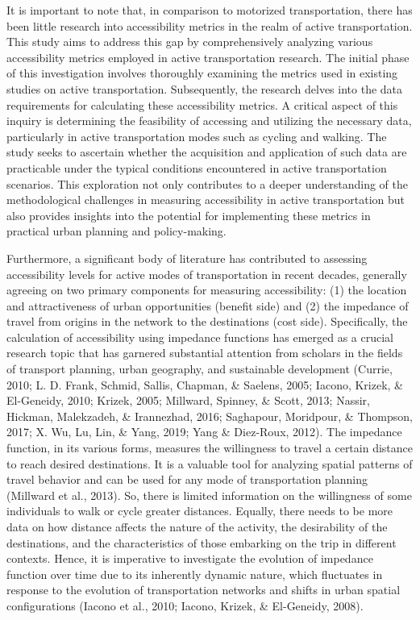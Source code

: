 \documentclass[12pt,twoside]{reedthesis}
\begin{document}
It is important to note that, in comparison to motorized transportation, there has been little research into accessibility metrics in the realm of active transportation. This study aims to address this gap by comprehensively analyzing various accessibility metrics employed in active transportation research. The initial phase of this investigation involves thoroughly examining the metrics used in existing studies on active transportation. Subsequently, the research delves into the data requirements for calculating these accessibility metrics. A critical aspect of this inquiry is determining the feasibility of accessing and utilizing the necessary data, particularly in active transportation modes such as cycling and walking. The study seeks to ascertain whether the acquisition and application of such data are practicable under the typical conditions encountered in active transportation scenarios. This exploration not only contributes to a deeper understanding of the methodological challenges in measuring accessibility in active transportation but also provides insights into the potential for implementing these metrics in practical urban planning and policy-making.

Furthermore, a significant body of literature has contributed to assessing accessibility levels for active modes of transportation in recent decades, generally agreeing on two primary components for measuring accessibility: (1) the location and attractiveness of urban opportunities (benefit side) and (2) the impedance of travel from origins in the network to the destinations (cost side). Specifically, the calculation of accessibility using impedance functions has emerged as a crucial research topic that has garnered substantial attention from scholars in the fields of transport planning, urban geography, and sustainable development (Currie, 2010; L. D. Frank, Schmid, Sallis, Chapman, \& Saelens, 2005; Iacono, Krizek, \& El-Geneidy, 2010; Krizek, 2005; Millward, Spinney, \& Scott, 2013; Nassir, Hickman, Malekzadeh, \& Irannezhad, 2016; Saghapour, Moridpour, \& Thompson, 2017; X. Wu, Lu, Lin, \& Yang, 2019; Yang \& Diez-Roux, 2012). The impedance function, in its various forms, measures the willingness to travel a certain distance to reach desired destinations. It is a valuable tool for analyzing spatial patterns of travel behavior and can be used for any mode of transportation planning (Millward et al., 2013). So, there is limited information on the willingness of some individuals to walk or cycle greater distances. Equally, there needs to be more data on how distance affects the nature of the activity, the desirability of the destinations, and the characteristics of those embarking on the trip in different contexts. Hence, it is imperative to investigate the evolution of impedance function over time due to its inherently dynamic nature, which fluctuates in response to the evolution of transportation networks and shifts in urban spatial configurations (Iacono et al., 2010; Iacono, Krizek, \& El-Geneidy, 2008).
\end{document}

